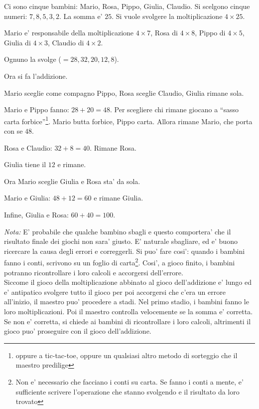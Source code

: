 \documentclass[a4paper]{article}
\begin{document}
\begin{exemp}
Ci sono cinque bambini: Mario, Rosa, Pippo, Giulia, Claudio. Si scelgono cinque numeri: $7,8,5,3,2$. La somma e' $25$. Si vuole svolgere la moltiplicazione $4\times 25$.

Mario e' responsabile della moltiplicazione $4\times 7$, Rosa di $4\times 8$, Pippo di $4\times 5$, Giulia di $4\times 3$, Claudio di $4\times 2$.

Ognuno la svolge ($=28, 32,20,12,8$).

Ora si fa l'addizione.

Mario sceglie come compagno Pippo, Rosa sceglie Claudio, Giulia rimane sola.

Mario e Pippo fanno: $28+20=48$. Per scegliere chi rimane giocano a ``sasso carta forbice''\footnote{oppure a tic-tac-toe, oppure un qualsiasi altro metodo di sorteggio che il maestro predilige}. Mario butta forbice, Pippo carta. Allora rimane Mario, che porta con se $48$.

Rosa e Claudio: $32+8=40$. Rimane Rosa.

Giulia tiene il $12$ e rimane.

Ora Mario sceglie Giulia e Rosa sta' da sola.

Mario e Giulia: $48+12=60$ e rimane Giulia.

Infine, Giulia e Rosa: $60+40=100$.

\end{exemp}


\emph{Nota:} E' probabile che qualche bambino sbagli e questo comportera' che il risultato finale dei giochi non sara' giusto. E' naturale sbagliare, ed e' buono ricercare la causa degli errori e correggerli. Si puo' fare cosi': quando i bambini fanno i conti, scrivono su un foglio di carta\footnote{Non e' necessario che facciano i conti su carta. Se fanno i conti a mente, e' sufficiente scrivere l'operazione che stanno svolgendo e il risultato da loro trovato}. Cosi', a gioco finito, i bambini potranno ricontrollare i loro calcoli e accorgersi dell'errore.\\
Siccome il gioco della moltiplicazione abbinato al gioco dell'addizione e' lungo ed e' antipatico svolgere tutto il gioco per poi accorgersi che c'era un errore all'inizio, il maestro puo' procedere a stadi. Nel primo stadio, i bambini fanno le loro moltiplicazioni. Poi il maestro controlla velocemente se la somma e' corretta. Se non e' corretta, si chiede ai bambini di ricontrollare i loro calcoli, altrimenti il gioco puo' proseguire con il gioco dell'addizione.
\end{document}
